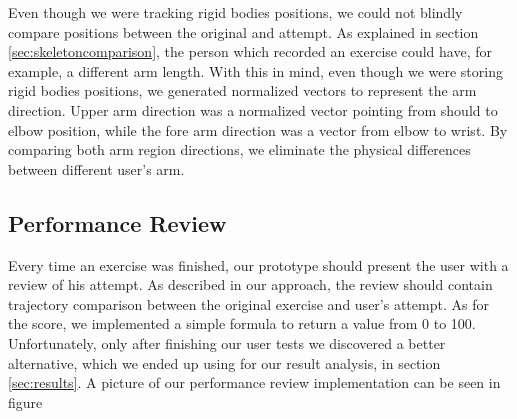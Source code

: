 Even though we were tracking rigid bodies positions, we could not blindly compare positions between the original and attempt.
As explained in section \ref{sec:skeletoncomparison}, the person which recorded an exercise could have, for example, a different arm length.
With this in mind, even though we were storing rigid bodies positions, we generated normalized vectors to represent the arm direction. 
Upper arm direction was a normalized vector pointing from should to elbow position, while the fore arm direction was a vector from elbow to wrist.
By comparing both arm region directions, we eliminate the physical differences between different user's arm.


\subsection{Performance Review}


Every time an exercise was finished, our prototype should present the user with a review of his attempt. 
As described in our approach, the review should contain trajectory comparison between the original exercise and user's attempt.
As for the score, we implemented a simple formula to return a value from 0 to 100. 
Unfortunately, only after finishing our user tests we discovered a better alternative, which we ended up using for our result analysis, in section \ref{sec:results}.
A picture of our performance review implementation can be seen in figure 
